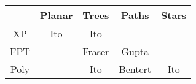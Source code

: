 
\renewcommand{\arraystretch}{1.5}
\setlength{\tabcolsep}{5pt}
\begin{tabular}{|c||c|c|c|c|}
	\hline

	&
	Planar &
	Trees &
	Paths &
	Stars \\

	\hline
	\hline

	XP &
	\cellcolor{lightgray} Ito &
	\cellcolor{skyblue} Ito &
	\cellcolor{skyblue} &
	\cellcolor{skyblue} \\

	\hline

	FPT &
	\cellcolor{lightgray} &
	\cellcolor{gray} Fraser &
	\cellcolor{skyblue} Gupta &
	\cellcolor{skyblue} \\

	\hline

	Poly &
	\cellcolor{lightgray} &
	\cellcolor{lightgray} Ito &
	\cellcolor{lightgray} Bentert &
	\cellcolor{skyblue} Ito \\

	\hline
\end{tabular}
\renewcommand{\arraystretch}{1}